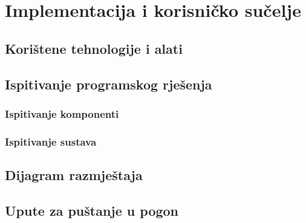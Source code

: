 \chapter{Implementacija i korisničko sučelje}
		
		
		\section{Korištene tehnologije i alati}
			
			\eject 
		
	
		\section{Ispitivanje programskog rješenja}
			
			\subsection{Ispitivanje komponenti}
		
			
			\subsection{Ispitivanje sustava}
		
			 \begin{itemize}
			 	
			 \end{itemize}
			
			\eject 
		
		
		\section{Dijagram razmještaja}
			
			\eject 
		
		\section{Upute za puštanje u pogon}
		
			\eject 